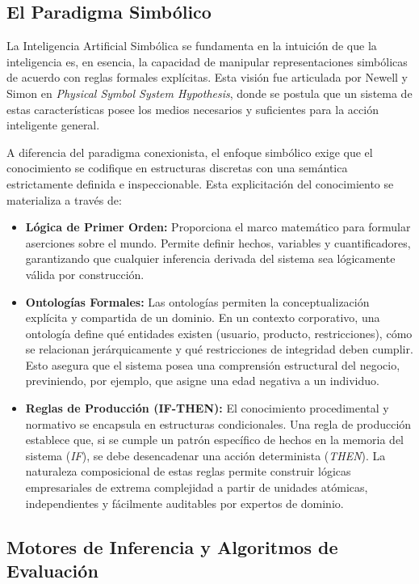 \documentclass[12pt,a4paper]{report}
\begin{document}
\subsection{El Paradigma Simbólico}

La Inteligencia Artificial Simbólica se fundamenta en la intuición de que la inteligencia es, en esencia, la capacidad de manipular representaciones simbólicas de acuerdo con reglas formales explícitas. Esta visión fue articulada por Newell y Simon \cite{newell1976symbols} en \textit{Physical Symbol System Hypothesis}, donde se postula que un sistema de estas características posee los medios necesarios y suficientes para la acción inteligente general.

A diferencia del paradigma conexionista, el enfoque simbólico exige que el conocimiento se codifique en estructuras discretas con una semántica estrictamente definida e inspeccionable. Esta explicitación del conocimiento se materializa a través de:

\begin{itemize}
    \item \textbf{Lógica de Primer Orden:} Proporciona el marco matemático para formular aserciones sobre el mundo. Permite definir hechos, variables y cuantificadores, garantizando que cualquier inferencia derivada del sistema sea lógicamente válida por construcción.
    \item \textbf{Ontologías Formales:} Las ontologías permiten la conceptualización explícita y compartida de un dominio. En un contexto corporativo, una ontología define qué entidades existen (usuario, producto, restricciones), cómo se relacionan jerárquicamente y qué restricciones de integridad deben cumplir. Esto asegura que el sistema posea una comprensión estructural del negocio, previniendo, por ejemplo, que asigne una edad negativa a un individuo.
    \item \textbf{Reglas de Producción (IF-THEN):} El conocimiento procedimental y normativo se encapsula en estructuras condicionales. Una regla de producción establece que, si se cumple un patrón específico de hechos en la memoria del sistema (\textit{IF}), se debe desencadenar una acción determinista (\textit{THEN}). La naturaleza composicional de estas reglas permite construir lógicas empresariales de extrema complejidad a partir de unidades atómicas, independientes y fácilmente auditables por expertos de dominio.
\end{itemize}

\subsection{Motores de Inferencia y Algoritmos de Evaluación}
\end{document}
